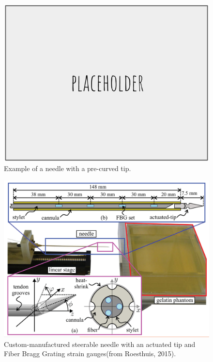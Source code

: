\begin{figure}[h]
\includegraphics[width=1.0\textwidth]{Fig/placeholder.png}
\caption{Example of a needle with a pre-curved tip\cite{reed_integrated_2008}.}
\label{fig:kinked_tip}
\end{figure}

\begin{figure}[h]
\includegraphics[width=1.0\textwidth]{Fig/chap2/actuated_tip_needle.png}
\caption{Custom-manufactured steerable needle with an actuated tip and Fiber Bragg Grating strain gauges(from Roesthuis, 2015\cite{roesthuis_modeling_2015}).}
\label{fig:actuated_tip}
\end{figure}

